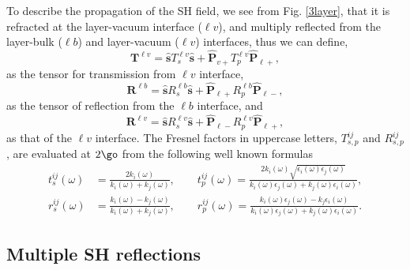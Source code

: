 \documentclass[aps,11pt]{revtex4}
\begin{document}
To describe the propagation of the SH field, we  see from
Fig. \ref{3layer}, that it is refracted at the 
layer-vacuum interface ($\ell v$), and multiply reflected from the
layer-bulk ($\ell b$)
and layer-vacuum ($\ell v$)
interfaces, thus we can define,
\begin{equation}\label{r5}
\mathbf{T}^{\ell v}
= \hat{\mathbf{s}}T_s^{\ell v}\hat{\mathbf{s}} 
+ \hat{\mathbf{P}}_{v+}T_{p}^{\ell v} \hat{\mathbf{P}}_{\ell +},
\end{equation}
as the tensor for transmission from $\ell v$ interface,
\begin{equation}\label{r6}
\mathbf{R}^{\ell b}
= \hat{\mathbf{s}}R_s^{\ell b}\hat{\mathbf{s}}
+ \hat{\mathbf{P}}_{\ell +}R_{p}^{\ell b} \hat{\mathbf{P}}_{\ell -},
\end{equation} 
as the tensor of reflection from the $\ell b$ interface, 
and
\begin{equation}\label{r6b}
\mathbf{R}^{\ell v}
= \hat{\mathbf{s}}R_s^{\ell v}\hat{\mathbf{s}}
+ \hat{\mathbf{P}}_{\ell -}R_{p}^{\ell v} \hat{\mathbf{P}}_{\ell +},
\end{equation} 
as that of the $\ell v$ interface. 
The Fresnel factors in uppercase letters, $T^{ij}_{s,p}$ and $R^{ij}_{s,p}$,
are evaluated at $2\go$  from the following well known formulas 
\begin{equation}\label{e.f1}
\begin{split}
t_s^{ij}(\omega) &=
\frac{2k_{i}(\omega)}{k_{i}(\omega)+k_{j}(\omega)},
\quad\quad  
t_{p}^{ij}(\omega) =
\frac{2k_{i}(\omega)\sqrt{\epsilon_{i}(\omega)\epsilon_j(\omega)}}
     {k_{i}(\omega)\epsilon_{j}(\omega)+k_{j}(\omega)\epsilon_{i}(\omega)},\\
r_s^{ij}(\omega) &=
\frac{k_{i}(\omega) - k_{j}(\omega)}
     {k_{i}(\omega) + k_{j}(\omega)},
\quad\quad 
r_{p}^{ij}(\omega) =
\frac{k_{i}(\omega)\epsilon_{j}(\omega) - k_{j}\epsilon_{i}(\omega)}
     {k_{i}(\omega)\epsilon_{j}(\omega) + k_{j}(\omega)\epsilon_{i}(\omega)}. 
\end{split}
\end{equation}

\subsection{Multiple SH reflections}
\end{document}

